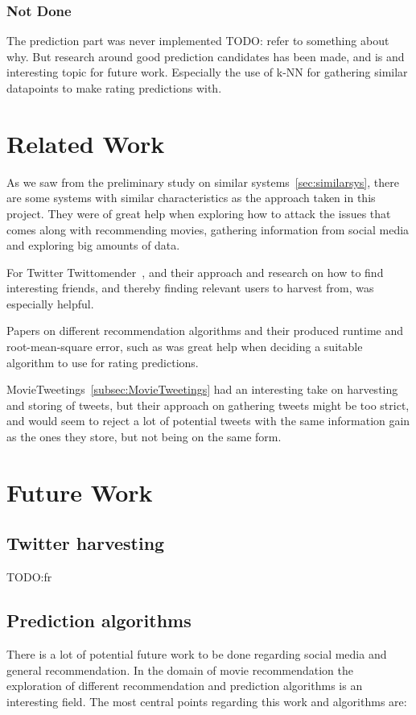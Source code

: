 \subsubsection{Not Done}
The prediction part was never implemented TODO: refer to something about why. But research around good prediction candidates has been made, and is and interesting topic for future work. Especially the use of k-NN for gathering similar datapoints to make rating predictions with.





\section{Related Work}
As we saw from the preliminary study on similar systems~\ref{sec:similarsys}, there are some systems with similar characteristics as the approach taken in this project. They were of great help when exploring how to attack the issues that comes along with recommending movies, gathering information from social media and exploring big amounts of data.

For Twitter Twittomender~\cite{twittomender}, and their approach and research on how to find interesting friends, and thereby finding relevant users to harvest from, was especially helpful.

Papers on different recommendation algorithms and their produced runtime and root-mean-square error, such as \cite{bigchaos-sol,alsMPI,BellKor-CF-TD} was great help when deciding a suitable algorithm to use for rating predictions.

MovieTweetings~\ref{subsec:MovieTweetings} had an interesting take on harvesting and storing of tweets, but their approach on gathering tweets might be too strict, and would seem to reject a lot of potential tweets with the same information gain as the ones they store, but not being on the same form.




\section{Future Work}
\subsection{Twitter harvesting}
TODO:fr



\subsection{Prediction algorithms}
There is a lot of potential future work to be done regarding social media and general recommendation. In the domain of movie recommendation the exploration of different recommendation and prediction algorithms is an interesting field. The most central points regarding this work and algorithms are:

